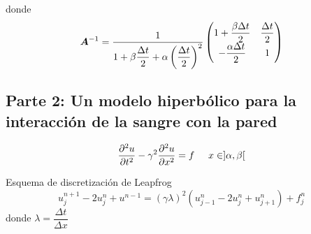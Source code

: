 donde 
\begin{equation}
\boldsymbol{A}^{-1} = \dfrac{1}{1 + \beta \dfrac{\Delta t}{2} + \alpha \left( \dfrac{\Delta t}{2} \right)^2 } 
\begin{pmatrix}
1 + \dfrac{\beta \Delta t}{2} & \dfrac{\Delta t}{2}\\
-\dfrac{\alpha \Delta t}{2} & 1 
\end{pmatrix}
\end{equation}

\subsection{Parte 2: Un modelo hiperbólico para la interacción de la sangre con la pared}

\begin{equation}
\dfrac{\partial^2 u}{\partial t^2} - \gamma^2 \dfrac{\partial^2 u}{\partial x^2} = f \hspace{0,5cm} x \in ] \alpha , \beta [
\end{equation}

Esquema de discretización de Leapfrog
\begin{equation}
u^{n+1}_j - 2u^n_j + u^{n-1} = (\gamma \lambda)^2 ( u^n_{j-1} -2 u^n_j + u^n_{j+1} ) + f^n_j
\end{equation}
donde $\lambda=\dfrac{\Delta t}{\Delta x}$
